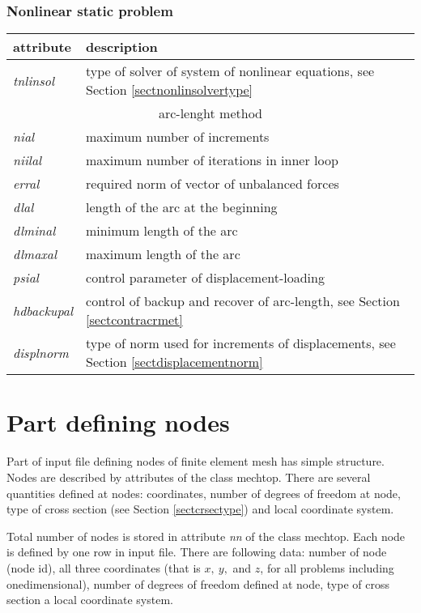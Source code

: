 \subsubsection{Nonlinear static problem}

\begin{center}
\begin{tabular}{|l|l|}
\hline
attribute & description
\\ \hline
{\it tnlinsol} & type of solver of system of nonlinear equations, see Section \ref{sectnonlinsolvertype}
\\ \hline
\multicolumn{2}{c}{arc-lenght method}
\\ \hline
{\it nial} & maximum number of increments
\\
{\it niilal} & maximum number of iterations in inner loop
\\
{\it erral} & required norm of vector of unbalanced forces
\\
{\it dlal} & length of the arc at the beginning
\\
{\it dlminal} & minimum length of the arc
\\
{\it dlmaxal} & maximum length of the arc
\\
{\it psial} & control parameter of displacement-loading
\\
{\it hdbackupal} & control of backup and recover of arc-length, see Section \ref{sectcontracrmet}
\\
{\it displnorm} & type of norm used for increments of displacements, see Section \ref{sectdisplacementnorm}
\\ \hline
\end{tabular}
\end{center}


\section{Part defining nodes}

Part of input file defining nodes of finite element mesh has simple structure. Nodes are described by attributes
of the class {\sf mechtop}. There are several quantities defined at nodes: coordinates, number of degrees of
freedom at node, type of cross section (see Section \ref{sectcrsectype}) and local coordinate system.

Total number of nodes is stored in attribute {\it nn} of the class {\sf mechtop}.
Each node is defined by one row in input file. There are following data: number of node (node id), all three coordinates
(that is $x,\ y,$ and $z$, for all problems including onedimensional), number of degrees of freedom defined at node,
type of cross section a local coordinate system.

